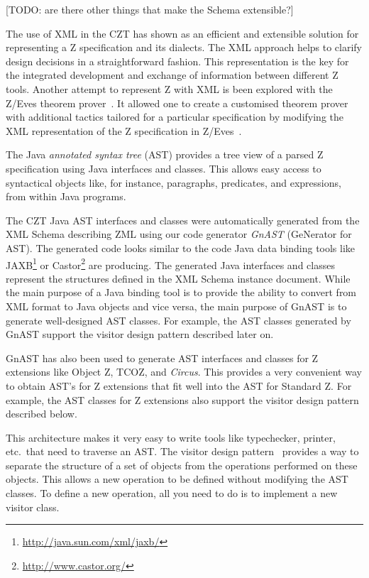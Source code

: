 \documentclass{llncs}
\newcommand{\Circus}{{\sf\slshape Circus}}
\begin{document}
  [TODO: are there other things that make the Schema extensible?]

  The use of XML in the CZT has shown as an efficient and extensible solution
  for representing a Z specification and its dialects.
  The XML approach helps to clarify design decisions in a straightforward fashion.
  This representation is the key for the integrated development and exchange of
  information between different Z tools.
  Another attempt to represent Z with XML is been explored with the Z/Eves theorem
  prover~\cite{tp.tools:zeves.ref}. It allowed one to create a customised theorem
  prover with additional tactics tailored for a particular specification by modifying
  the XML representation of the Z specification in Z/Eves~\cite{tp.tools:zeves.api}.

  The Java \emph{annotated syntax tree} (AST) provides a tree view of
  a parsed Z specification using Java interfaces and classes.  This
  allows easy access to syntactical objects like, for instance,
  paragraphs, predicates, and expressions, from within Java programs.

  The CZT Java AST interfaces and classes were automatically generated
  from the XML Schema describing ZML using our code generator
  \emph{GnAST} (GeNerator for AST).  The generated code looks similar
  to the code Java data binding tools like
  JAXB\footnote{\url{http://java.sun.com/xml/jaxb/}} or
  Castor\footnote{\url{http://www.castor.org/}} are producing.  The
  generated Java interfaces and classes represent the structures
  defined in the XML Schema instance document.  While the main purpose
  of a Java binding tool is to provide the ability to convert from XML
  format to Java objects and vice versa, the main purpose of GnAST is
  to generate well-designed AST classes.  For example, the AST classes
  generated by GnAST support the visitor design pattern described
  later on.

  GnAST has also been used to generate AST interfaces and classes for
  Z extensions like Object Z, TCOZ, and \Circus.  This provides a very
  convenient way to obtain AST's for Z extensions that fit well into
  the AST for Standard Z.  For example, the AST classes for Z
  extensions also support the visitor design pattern described below.

  This architecture makes it very easy to write tools like
  typechecker, printer, etc.\ that need to traverse an AST.  The
  visitor design pattern~\cite{GamEA:95,MaiCha:01} provides a way to
  separate the structure of a set of objects from the operations
  performed on these objects.  This allows a new operation to be
  defined without modifying the AST classes.  To define a new
  operation, all you need to do is to implement a new visitor class.
\end{document}
